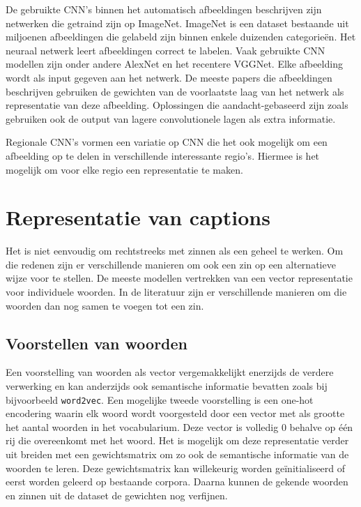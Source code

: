 De gebruikte CNN's binnen het automatisch afbeeldingen beschrijven zijn netwerken die getraind zijn op ImageNet.\cite{Russakovsky2014} ImageNet is een dataset bestaande uit miljoenen afbeeldingen die gelabeld zijn binnen enkele duizenden categorie\"en. Het neuraal netwerk leert afbeeldingen correct te labelen. Vaak gebruikte CNN modellen zijn onder andere AlexNet \cite{Krizhevsky2012a} en het recentere VGGNet\cite{Arge2015}. Elke afbeelding wordt als input gegeven aan het netwerk. De meeste papers die afbeeldingen beschrijven gebruiken de gewichten van de voorlaatste laag van het netwerk als representatie van deze afbeelding. \cite{Google,Mao2014a,Karpathy2015,Chen2014}  Oplossingen die aandacht-gebaseerd zijn zoals \cite{Xu2015,Jin2015} gebruiken ook de output van lagere convolutionele lagen als extra informatie.

Regionale CNN's vormen een variatie op CNN die het ook mogelijk om een afbeelding op te delen in verschillende interessante regio's. Hiermee is het mogelijk om voor elke regio een representatie te maken.\cite{Karpathy2015}\cite{Mitchell2015} 

\section{Representatie van captions}
Het is niet eenvoudig om rechtstreeks met zinnen als een geheel te werken. Om die redenen zijn er verschillende manieren om ook een zin op een alternatieve wijze voor te stellen.
De meeste modellen vertrekken van een vector representatie voor individuele woorden. In de literatuur zijn er verschillende manieren om die woorden dan nog samen te voegen tot een zin.

\subsection{Voorstellen van woorden}
 Een voorstelling van woorden als vector vergemakkelijkt enerzijds de verdere verwerking en kan anderzijds ook semantische informatie bevatten zoals bij bijvoorbeeld \texttt{word2vec}.\cite{Mikolov2013} 
 Een mogelijke tweede voorstelling is een one-hot encodering waarin elk woord wordt voorgesteld door een vector met als grootte het aantal woorden in het vocabularium. Deze vector is volledig 0 behalve op \'e\'en rij die overeenkomt met het woord. Het is mogelijk om deze representatie verder uit breiden met een gewichtsmatrix om zo ook de semantische informatie van de woorden te leren. Deze gewichtsmatrix kan willekeurig worden ge\"initialiseerd of eerst worden geleerd op bestaande corpora.\cite{Lebret2013}\cite{Google}\cite{Mao2014a} Daarna kunnen de gekende woorden en zinnen uit de dataset de gewichten nog verfijnen.  

